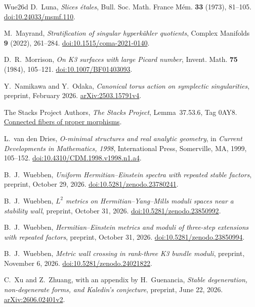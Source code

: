 \begin{thebibliography}{Wue26d}
D.~Luna, \textit{Slices \'etales},
Bull. Soc. Math. France M\'em. \textbf{33} (1973), 81--105.
\href{https://doi.org/10.24033/msmf.110}{doi:10.24033/msmf.110}.

M.~Mayrand, \textit{Stratification of singular hyperk\"ahler quotients},
Complex Manifolds \textbf{9} (2022), 261--284.
\href{https://doi.org/10.1515/coma-2021-0140}{doi:10.1515/coma-2021-0140}.

D.~R.~Morrison, \textit{On K3 surfaces with large Picard number},
Invent. Math. \textbf{75} (1984), 105--121.
\href{https://doi.org/10.1007/BF01403093}{doi:10.1007/BF01403093}.

Y.~Namikawa and Y.~Odaka, \textit{Canonical torus action on symplectic
singularities}, preprint, February 2026.
\href{https://arxiv.org/abs/2503.15791v4}{arXiv:2503.15791v4}.

The Stacks Project Authors, \textit{The Stacks Project},
Lemma~37.53.6, Tag 0AY8.
\href{https://stacks.math.columbia.edu/tag/0AY8}{Connected fibers of proper morphisms}.

L.~van den Dries, \textit{O-minimal structures and real analytic geometry},
in \textit{Current Developments in Mathematics, 1998},
International Press, Somerville, MA, 1999, 105--152.
\href{https://doi.org/10.4310/CDM.1998.v1998.n1.a4}{doi:10.4310/CDM.1998.v1998.n1.a4}.

B.~J.~Wuebben, \textit{Uniform Hermitian--Einstein spectra with repeated
stable factors}, preprint, October 29, 2026.
\href{https://doi.org/10.5281/zenodo.23780241}{doi:10.5281/zenodo.23780241}.

B.~J.~Wuebben, \textit{$L^2$ metrics on Hermitian--Yang--Mills moduli
spaces near a stability wall}, preprint, October 31, 2026.
\href{https://doi.org/10.5281/zenodo.23850992}{doi:10.5281/zenodo.23850992}.

B.~J.~Wuebben, \textit{Hermitian--Einstein metrics and moduli of three-step
extensions with repeated factors}, preprint, October 31, 2026.
\href{https://doi.org/10.5281/zenodo.23850994}{doi:10.5281/zenodo.23850994}.

B.~J.~Wuebben, \textit{Metric wall crossing in rank-three K3 bundle moduli},
preprint, November 6, 2026.
\href{https://doi.org/10.5281/zenodo.24021822}{doi:10.5281/zenodo.24021822}.

C.~Xu and Z.~Zhuang, with an appendix by H.~Guenancia,
\textit{Stable degeneration, non-degenerate forms, and Kaledin's conjecture},
preprint, June 22, 2026.
\href{https://arxiv.org/abs/2606.02401v2}{arXiv:2606.02401v2}.
\end{thebibliography}
